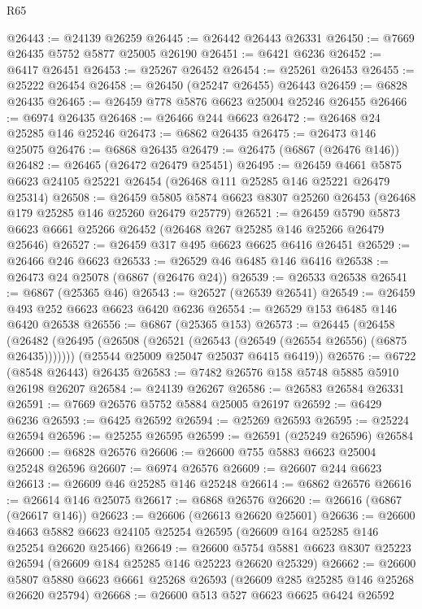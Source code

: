 \begin{lexlean}{R65}
\begin{coremodule}
{@26443 := @24139 @26259
@26445 := @26442 @26443 @26331
@26450 := @7669 @26435 @5752 @5877 @25005 @26190
@26451 := @6421 @6236
@26452 := @6417 @26451
@26453 := @25267 @26452
@26454 := @25261 @26453
@26455 := @25222 @26454
@26458 := @26450 (@25247 @26455) @26443
@26459 := @6828 @26435
@26465 := @26459 @778 @5876 @6623 @25004 @25246 @26455
@26466 := @6974 @26435
@26468 := @26466 @244 @6623
@26472 := @26468 @24 @25285 @146 @25246
@26473 := @6862 @26435
@26475 := @26473 @146 @25075
@26476 := @6868 @26435
@26479 := @26475 (@6867 (@26476 @146))
@26482 := @26465 (@26472 @26479 @25451)
@26495 := @26459
    @4661
    @5875
    @6623
    @24105
    @25221
    @26454
    (@26468 @111 @25285 @146 @25221 @26479 @25314)
@26508 := @26459
    @5805
    @5874
    @6623
    @8307
    @25260
    @26453
    (@26468 @179 @25285 @146 @25260 @26479 @25779)
@26521 := @26459
    @5790
    @5873
    @6623
    @6661
    @25266
    @26452
    (@26468 @267 @25285 @146 @25266 @26479 @25646)
@26527 := @26459 @317 @495 @6623 @6625 @6416 @26451
@26529 := @26466 @246 @6623
@26533 := @26529 @46 @6485 @146 @6416
@26538 := @26473 @24 @25078 (@6867 (@26476 @24))
@26539 := @26533 @26538
@26541 := @6867 (@25365 @46)
@26543 := @26527 (@26539 @26541)
@26549 := @26459 @493 @252 @6623 @6623 @6420 @6236
@26554 := @26529 @153 @6485 @146 @6420 @26538
@26556 := @6867 (@25365 @153)
@26573 := @26445
    (@26458
      (@26482 (@26495 (@26508 (@26521 (@26543 (@26549 (@26554 @26556) (@6875 @26435)))))))
      (@25544 @25009 @25047 @25037 @6415 @6419))
@26576 := @6722 (@8548 @26443) @26435
@26583 := @7482 @26576 @158 @5748 @5885 @5910 @26198 @26207
@26584 := @24139 @26267
@26586 := @26583 @26584 @26331
@26591 := @7669 @26576 @5752 @5884 @25005 @26197
@26592 := @6429 @6236
@26593 := @6425 @26592
@26594 := @25269 @26593
@26595 := @25224 @26594
@26596 := @25255 @26595
@26599 := @26591 (@25249 @26596) @26584
@26600 := @6828 @26576
@26606 := @26600 @755 @5883 @6623 @25004 @25248 @26596
@26607 := @6974 @26576
@26609 := @26607 @244 @6623
@26613 := @26609 @46 @25285 @146 @25248
@26614 := @6862 @26576
@26616 := @26614 @146 @25075
@26617 := @6868 @26576
@26620 := @26616 (@6867 (@26617 @146))
@26623 := @26606 (@26613 @26620 @25601)
@26636 := @26600
    @4663
    @5882
    @6623
    @24105
    @25254
    @26595
    (@26609 @164 @25285 @146 @25254 @26620 @25466)
@26649 := @26600
    @5754
    @5881
    @6623
    @8307
    @25223
    @26594
    (@26609 @184 @25285 @146 @25223 @26620 @25329)
@26662 := @26600
    @5807
    @5880
    @6623
    @6661
    @25268
    @26593
    (@26609 @285 @25285 @146 @25268 @26620 @25794)
@26668 := @26600 @513 @527 @6623 @6625 @6424 @26592
}
\end{coremodule}
\end{lexlean}
